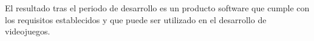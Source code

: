 El resultado tras el periodo de desarrollo es un producto software que cumple con los requisitos establecidos y que puede ser utilizado en el desarrollo de videojuegos.